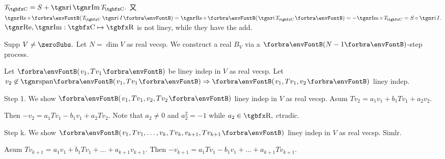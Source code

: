 $T_{\!\Cbb}=S+\i\,\IMAGINARY\,T_{\!\Cbb}.$ 又 $\REAL\circ\Par{T_{\!\Cbb}\:\i\, I}=\REAL\circ\Par{\i\,T_{\!\Cbb}}=-\IMAGINARY\circ T_{\!\Cbb}=S\circ\i\,I.$\PfEnd
\AComm $\REAL,\IMAGINARY:\Cbb\mapsto\Rbb$ is not liney, while they have the add.
\SepLine

\SepLine

Supp $V\neq\zeroSubs.$ Let $N=\dim V$ as real vecsp. We construct a real $B_V$ via a $\Par[0pt]{N-1}$\hspace{1pt}-\hspace{1pt}step process.\par\quad
Let $\Par{v_1,Tv_1}$ be liney indep in $V$ as real vecsp. Let $v_2\not\in\Span{v_1,Tv_1}\Rightarrow\Par{v_1,Tv_1,v_2}$ liney indep.\vspace{1pt}\par\quad
{\tgbf Step 1.} \;We show $\Par{v_1,Tv_1,v_2,Tv_2}$ liney indep in $V$ as real vecsp. Asum $Tv_2=a_1v_1+b_1Tv_1+a_2v_2.$\par\quad
{}Then $-v_2=a_1Tv_1-b_1v_1+a_2Tv_2.$ Note that $a_2\neq0$ and $a_2^2=-1$ while $a_2\in\Rbb,$ ctradic.\vspace{2pt}\par\quad
{\tgbf Step k.} \;\! We show $\Par{v_1,Tv_1,\dots,v_k,Tv_k,v_{k+1},Tv_{k+1}}$ liney indep in $V$ as real vecsp. Simlr.\par\quad
{}Asum $Tv_{k+1}=a_1v_1+b_1Tv_1+\dots+a_{k+1}v_{k+1}.$ Then $-v_{k+1}=a_1Tv_1-b_1v_1+\dots+a_{k+1}Tv_{k+1}.$\PfEnd
\SepLine

